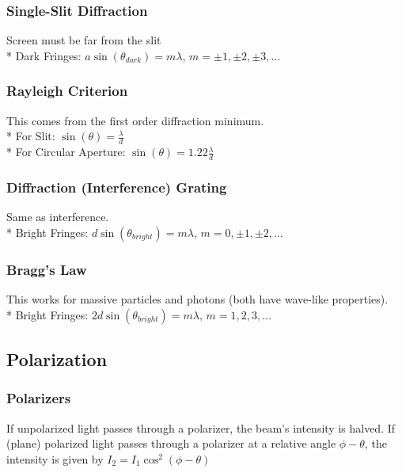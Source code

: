 \subsubsection{Single-Slit Diffraction}
Screen must be far from the slit\\*
Dark Fringes: \(a\sin(\theta_{dark})=m\lambda\), \(m=\pm1,\pm2,\pm3,\ldots\)

\subsubsection{Rayleigh Criterion}
This comes from the first order diffraction minimum.\\*
For Slit: \(\displaystyle\sin(\theta)=\frac{\lambda}{d}\)\\*
For Circular Aperture:  \(\displaystyle\sin(\theta)=1.22\frac{\lambda}{d}\)

\subsubsection{Diffraction (Interference) Grating}
Same as interference.\\*
Bright Fringes: \(d\sin(\theta_{bright})=m\lambda\), \(m=0,\pm1,\pm2,\ldots\)

\subsubsection{Bragg's Law}
This works for massive particles and photons (both have wave-like properties).\\*
Bright Fringes: \(2d\sin(\theta_{bright})=m\lambda\), \(m=1,2,3,\ldots\)

\subsection{Polarization}

\subsubsection{Polarizers}
If unpolarized light passes through a polarizer, the beam's intensity is halved.
If (plane) polarized light passes through a polarizer at a relative angle \(\phi-\theta\), the intensity is given by \(I_2=I_1\cos^2(\phi-\theta)\)

